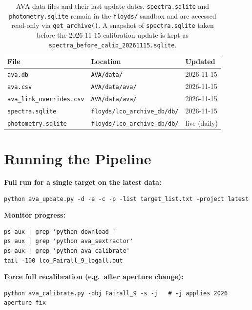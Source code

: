 \documentclass[12pt,a4paper]{article}
\begin{document}
\begin{table}[h!]
\centering
\small
\begin{tabular}{lll}
\toprule
File & Location & Updated \\
\midrule
\texttt{ava.db}                 & \texttt{AVA/data/} & 2026-11-15 \\
\texttt{ava.csv}                & \texttt{AVA/data/ava/} & 2026-11-15 \\
\texttt{ava\_link\_overrides.csv} & \texttt{AVA/data/ava/} & 2026-11-15 \\
\texttt{spectra.sqlite}         & \texttt{floyds/lco\_archive\_db/db/} & 2026-11-15 \\
\texttt{photometry.sqlite}      & \texttt{floyds/lco\_archive\_db/db/} & live (daily) \\
\bottomrule
\end{tabular}
\caption{AVA data files and their last update dates.  \texttt{spectra.sqlite}
  and \texttt{photometry.sqlite} remain in the \texttt{floyds/} sandbox and
  are accessed read-only via \texttt{get\_archive()}.  A snapshot of
  \texttt{spectra.sqlite} taken before the 2026-11-15 calibration update is
  kept as \texttt{spectra\_before\_calib\_20261115.sqlite}.}
\end{table}



\appendix
\section{Running the Pipeline}
\label{app:run}

\textbf{Full run for a single target on the latest data:}
\begin{lstlisting}[style=shell]
python ava_update.py -d -e -c -p -list target_list.txt -project latest
\end{lstlisting}

\textbf{Monitor progress:}
\begin{lstlisting}[style=shell]
ps aux | grep 'python download_'
ps aux | grep 'python ava_sextractor'
ps aux | grep 'python ava_calibrate'
tail -100 lco_Fairall_9_logall.out
\end{lstlisting}

\textbf{Force full recalibration (e.g.\ after aperture change):}
\begin{lstlisting}[style=shell]
python ava_calibrate.py -obj Fairall_9 -s -j   # -j applies 2026 aperture fix
\end{lstlisting}
\end{document}
